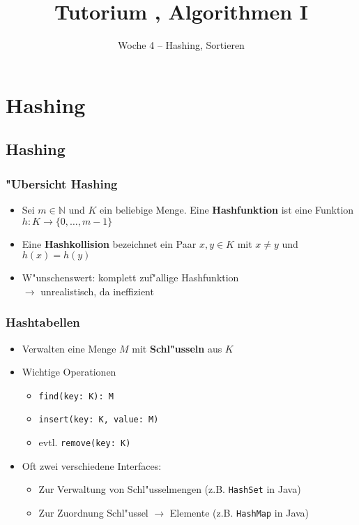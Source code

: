 

\title[Tutorium Algorithmen I]{Tutorium \tutNo, Algorithmen I}
\subtitle{Woche 4 -- Hashing, Sortieren}



\begin{frame}
  \titlepage
\end{frame}

\section{Hashing}

\subsection{Hashing}
\begin{frame}
  \frametitle{"Ubersicht Hashing}
  \begin{itemize}
  \item Sei $m \in \mathbb{N}$ und $K$ ein beliebige Menge.
        Eine \textbf{Hashfunktion} ist eine Funktion $h : K \rightarrow \{0,\ldots,m-1\}$
  \item Eine \textbf{Hashkollision} bezeichnet ein Paar $x, y \in K$ mit $x \neq y$ und
        $h(x) = h(y)$
  \item W"unschenswert: komplett zuf"allige Hashfunktion \\
          $\rightarrow$ unrealistisch, da ineffizient
  \end{itemize}
\end{frame}

\begin{frame}
  \frametitle{Hashtabellen}
  \begin{itemize}
  \item Verwalten eine Menge $M$ mit \textbf{Schl"usseln} aus $K$
  \item Wichtige Operationen
    \begin{itemize}
    \item \lstinline|find(key: K): M|
    \item \lstinline|insert(key: K, value: M)|
    \item evtl. \lstinline|remove(key: K)|
    \end{itemize}
  \item Oft zwei verschiedene Interfaces:
    \begin{itemize}
    \item Zur Verwaltung von Schl"usselmengen
             (z.B. \lstinline|HashSet| in Java)
    \item Zur Zuordnung Schl"ussel $\rightarrow$ Elemente
             (z.B. \lstinline|HashMap| in Java)
    \end{itemize}
  \end{itemize}
\end{frame}

